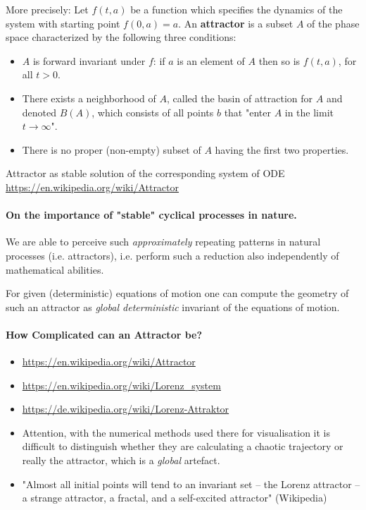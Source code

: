 \documentclass[11pt,a4paper]{article}
\begin{document}
More precisely: Let $f(t,a)$ be a function which specifies the dynamics of the
system with starting point $f(0,a)=a$. An \textbf{attractor} is a subset $A$
of the phase space characterized by the following three conditions:
\begin{itemize}
\item $A$ is forward invariant under $f$: if $a$ is an element of $A$ then so
  is $f(t,a)$, for all $t > 0$.  
\item There exists a neighborhood of $A$, called the basin of attraction for
  $A$ and denoted $B(A)$, which consists of all points $b$ that "enter $A$ in
  the limit $t\to\infty$".
\item There is no proper (non-empty) subset of $A$ having the first two
  properties.
\end{itemize}

Attractor as stable solution of the corresponding system of ODE\\
\url{https://en.wikipedia.org/wiki/Attractor}

\paragraph{On the importance of "stable" cyclical processes in nature.}
We are able to perceive such \emph{approximately} repeating patterns in
natural processes (i.e. attractors), i.e.  perform such a reduction also
independently of mathematical abilities.

For given (deterministic) equations of motion one can compute the geometry of
such an attractor as \emph{global deterministic} invariant of the equations of
motion.

\paragraph{How Complicated can an Attractor be?}
\begin{itemize}
\item \url{https://en.wikipedia.org/wiki/Attractor}
\item \url{https://en.wikipedia.org/wiki/Lorenz_system}
\item \url{https://de.wikipedia.org/wiki/Lorenz-Attraktor}
\item Attention, with the numerical methods used there for visualisation it is
  difficult to distinguish whether they are calculating a chaotic trajectory
  or really the attractor, which is a \emph{global} artefact.
\item "Almost all initial points will tend to an invariant set – the Lorenz
  attractor – a strange attractor, a fractal, and a self-excited attractor"
  (Wikipedia)
\end{itemize}
\end{document}
